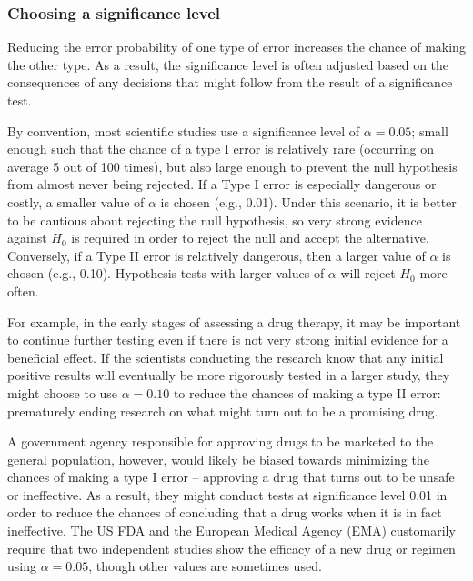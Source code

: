 \begin{spacing}{1.5}

\subsubsection{Choosing a significance level}


Reducing the error probability of one type of error increases the chance of making the other type. As a result, the significance level is often adjusted based on the consequences of any decisions that might follow from the result of a significance test.

\label{significanceLevel}

By convention, most scientific studies use a significance level of $\alpha = 0.05$; small enough such that the chance of a type I error is relatively rare (occurring on average 5 out of 100 times), but also large enough to prevent the null hypothesis from almost never being rejected. If a Type I error is especially dangerous or costly, a smaller value of $\alpha$ is chosen (e.g., 0.01). Under this scenario, it is better to be cautious about rejecting the null hypothesis, so very strong evidence against $H_0$ is required in order to reject the null and accept the alternative. Conversely, if a Type II error is relatively dangerous, then a larger value of $\alpha$ is chosen (e.g., 0.10). Hypothesis tests with larger values of $\alpha$ will reject $H_0$ more often.

For example, in the early stages of assessing a drug therapy, it may be important to continue further testing even if there is not very strong initial evidence for a beneficial effect. If the scientists conducting the research know that any initial positive results will eventually be more rigorously tested in a larger study, they might choose to use $\alpha = 0.10$ to reduce the chances of making a type II error: prematurely ending research on what might turn out to be a promising drug.

A government agency responsible for approving drugs to be marketed to the general population, however, would likely be biased towards minimizing the chances of making a type I error -- approving a drug that turns out to be unsafe or ineffective. As a result, they might conduct tests at significance level 0.01 in order to reduce the chances of concluding that a drug works when it is in fact ineffective. The US FDA and the European Medical Agency (EMA) customarily require that two independent studies show the efficacy of a new drug or regimen using $\alpha = 0.05$, though other values are sometimes used.


\end{spacing}
